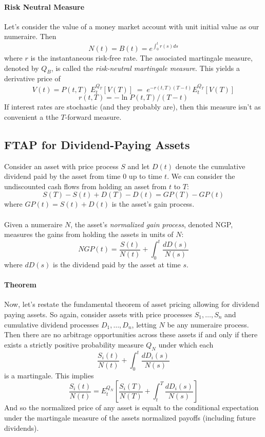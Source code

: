 \documentclass[a4paper,12pt]{scrartcl}
\begin{document}
\paragraph{Risk Neutral Measure} Let's consider the value of a money
market account with unit initial value as our numeraire.  Then
   \[ N(t) = B(t) = e^{\int_0^t r(s) ds} \]
where $r$ is the instantaneous risk-free rate.  The associated 
martingale measure, denoted by $Q_B$, is called the 
\emph{risk-neutral martingale measure}. This yields a derivative price
of 
   \[ V(t) = P(t,T) \; E_t^{Q_T}\left[V(T)\right] \; = \;
      e^{-r(t,T) (T-t)} E_t^{Q_T}\left[V(T)\right] \]
   \[ r(t,T) = -\ln{P(t,T)}/(T-t) \]
If interest rates are stochastic (and they probably are), then this
measure isn't as convenient a tthe $T$-forward measure.

\subsection{FTAP for Dividend-Paying Assets}

Consider an asset with price process $S$ and let $D(t)$ denote the
cumulative dividend paid by the asset from time 0 up to time $t$.
We can consider the undiscounted cash flows from holding an asset
from $t$ to $T$:
   \[ S(T) - S(t) + D(T) - D(t) = GP(T) - GP(t) \]
where $GP(t) = S(t) + D(t)$ is the asset's gain process.
\\
\\
Given a numeraire $N$, the asset's \emph{normalized gain process},
denoted NGP, measures the gains from holding the assets in units of $N$:
\[ NGP(t) = \frac{S(t)}{N(t)} + \int^t_0 \frac{dD(s)}{N(s)}\]
where $dD(s)$ is the dividend paid by the asset at time $s$.

\paragraph{Theorem} Now, let's restate the fundamental theorem of asset
pricing allowing for dividend paying assets.  So again, consider
assets with price processes $S_1, \ldots, S_n$ and cumulative dividend
processes $D_1,\ldots,D_n$, letting $N$ be any numeraire process.
Then there are no arbitrage opportunities across these assets if and
only if there exists a strictly positive probability measure $Q_N$ 
under which each
   \[ \frac{S_i(t)}{N(t)} + \int^t_0 \frac{dD_i(s)}{N(s)} \]
is a martingale. This implies
\[ \frac{S_i(t)}{N(t)}  = E_t^{Q_N}\left[ \frac{S_i(T)}{N(T)} +
   \int^T_t \frac{dD_i(s)}{N(s)}\right] \]
And so the normalized price of any asset is equalt to the conditional
expectation under the martingale measure of the assets normalized payoffs
(including future dividends).
\end{document}
